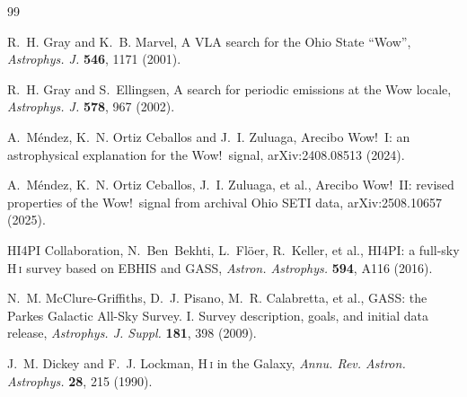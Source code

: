 \documentclass[3p,11pt]{elsarticle}
\begin{document}
\begin{thebibliography}{99}\small\raggedright
\setlength{\itemsep}{1pt}

R.~H. Gray and K.~B. Marvel, A VLA search for the Ohio State ``Wow'', \emph{Astrophys.
J.} \textbf{546}, 1171 (2001).

R.~H. Gray and S.~Ellingsen, A search for periodic emissions at the Wow locale,
\emph{Astrophys. J.} \textbf{578}, 967 (2002).

A.~M\'endez, K.~N. Ortiz Ceballos and J.~I. Zuluaga, Arecibo Wow!\ I: an astrophysical
explanation for the Wow!\ signal, arXiv:2408.08513 (2024).

A.~M\'endez, K.~N. Ortiz Ceballos, J.~I. Zuluaga, et al., Arecibo Wow!\ II: revised
properties of the Wow!\ signal from archival Ohio SETI data, arXiv:2508.10657 (2025).

HI4PI Collaboration, N.~Ben~Bekhti, L.~Fl\"oer, R.~Keller, et al., HI4PI: a full-sky
H\,\textsc{i} survey based on EBHIS and GASS, \emph{Astron. Astrophys.} \textbf{594},
A116 (2016).

N.~M. McClure-Griffiths, D.~J. Pisano, M.~R. Calabretta, et al., GASS: the Parkes
Galactic All-Sky Survey. I. Survey description, goals, and initial data release,
\emph{Astrophys. J. Suppl.} \textbf{181}, 398 (2009).

J.~M. Dickey and F.~J. Lockman, H\,\textsc{i} in the Galaxy, \emph{Annu. Rev. Astron.
Astrophys.} \textbf{28}, 215 (1990).

\end{thebibliography}
\end{document}
